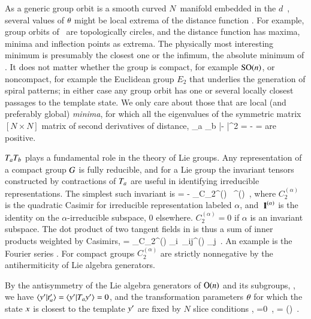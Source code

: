 As a generic group orbit is a smooth
curved $N$\dmn\ manifold embedded in
the $d$\dmn\ \statesp, several values of ${\bf \theta}$ might be local extrema of the
distance function . For example, group orbits of \
are topologically circles, and the distance function 
has maxima, minima and inflection points as extrema.
The physically most interesting minimum is
presumably the closest one or the infimum, the absolute minimum of .
It does not matter whether the group is compact, for example $\textrm{SO}(n)$, or
noncompact, for example the Euclidean group $E_2$ that underlies the generation
of spiral patterns\rf{Barkley94}; in either case any group orbit has
one or several locally closest passages to the template state.
We only care about
those that are local (and preferably global) {\em minima}, for which all the eigenvalues of the
symmetric matrix $[N\!\times\!N]$ matrix of second derivatives of
distance,
\beq
{}
     {\partial \gSpace_a \partial \gSpace_b}
        |\sspRed - \slicep|^2
    =
  - =
are positive.

$T_a T_b$ plays a fundamental role in the theory of Lie groups.
Any representation of a compact group $G$ is fully
reducible, and for a Lie group
the invariant tensors constructed by contractions
of $T_a$ are useful in identifying irreducible
representations. The simplest such invariant is
\beq
{\Lg} \cdot \Lg = - \sum_\alpha C_2^{(\alpha)} \, \id^{(\alpha)}
\,,
where $C_2^{(\alpha)}$ is the quadratic Casimir for
irreducible representation labeled $\alpha$, and
${\ \hbox{{\rm 1}\kern-.6em\hbox{\rm 1}}}^{(\alpha)}$ is the identity on the $\alpha$-irreducible
subspace, 0 elsewhere. $ C_2^{(\alpha)} =0$ if $\alpha$
is an invariant subspace.
The dot product of two tangent fields in
 is thus a sum of inner products
weighted by Casimirs,
\beq
\braket{\groupTan(\sspRed)}{\groupTan(\slicep)}
   = \sum_\alpha C_2^{(\alpha)} {\sspRed}_i\, \delta_{ij}^{(\alpha)} \slicep_j
\,.
An example is the Fourier series .
For compact groups $C_2^{(\alpha)}$ are strictly nonnegative by
the antihermiticity  of Lie algebra generators.


By the antisymmetry of the Lie algebra generators of
$\textrm{O}(n)$ and its subgroups, ,  we have
$\braket{\slicep}{\sliceTan{a}}
 = \braket{\slicep}{\Lg_{a}\slicep}=0$, and the transformation parameters
${\bf \theta}$ for which the state $x$ is closest to the template
${y'}$ are fixed by $N$ slice conditions ,
\beq
{} =0
    \,,\qquad
\sspRed = \LieEl(\gSpace) \ssp
\,.

